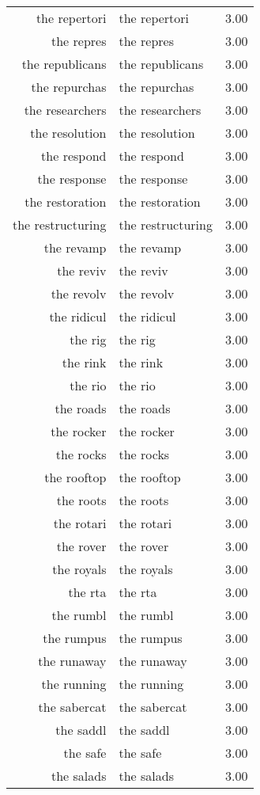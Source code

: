 \begin{table}[ht]
\begin{tabular}{rlr}
  the repertori & the repertori & 3.00 \\ 
  the repres & the repres & 3.00 \\ 
  the republicans & the republicans & 3.00 \\ 
  the repurchas & the repurchas & 3.00 \\ 
  the researchers & the researchers & 3.00 \\ 
  the resolution & the resolution & 3.00 \\ 
  the respond & the respond & 3.00 \\ 
  the response & the response & 3.00 \\ 
  the restoration & the restoration & 3.00 \\ 
  the restructuring & the restructuring & 3.00 \\ 
  the revamp & the revamp & 3.00 \\ 
  the reviv & the reviv & 3.00 \\ 
  the revolv & the revolv & 3.00 \\ 
  the ridicul & the ridicul & 3.00 \\ 
  the rig & the rig & 3.00 \\ 
  the rink & the rink & 3.00 \\ 
  the rio & the rio & 3.00 \\ 
  the roads & the roads & 3.00 \\ 
  the rocker & the rocker & 3.00 \\ 
  the rocks & the rocks & 3.00 \\ 
  the rooftop & the rooftop & 3.00 \\ 
  the roots & the roots & 3.00 \\ 
  the rotari & the rotari & 3.00 \\ 
  the rover & the rover & 3.00 \\ 
  the royals & the royals & 3.00 \\ 
  the rta & the rta & 3.00 \\ 
  the rumbl & the rumbl & 3.00 \\ 
  the rumpus & the rumpus & 3.00 \\ 
  the runaway & the runaway & 3.00 \\ 
  the running & the running & 3.00 \\ 
  the sabercat & the sabercat & 3.00 \\ 
  the saddl & the saddl & 3.00 \\ 
  the safe & the safe & 3.00 \\ 
  the salads & the salads & 3.00 \\ 

\end{tabular}
\end{table}
